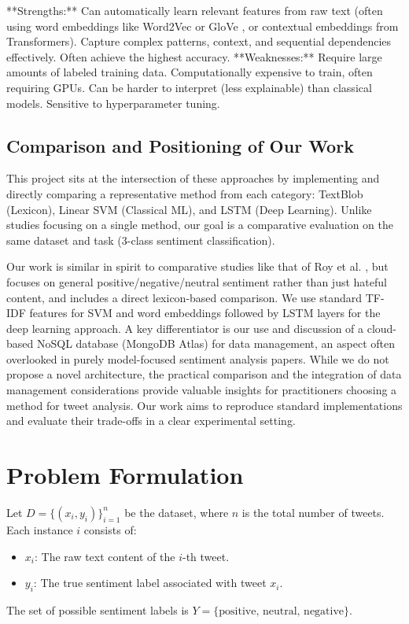 \documentclass[10pt,twocolumn]{article}
\begin{document}
**Strengths:** Can automatically learn relevant features from raw text (often using word embeddings like Word2Vec \cite{ref:word2vec} or GloVe \cite{ref:glove}, or contextual embeddings from Transformers). Capture complex patterns, context, and sequential dependencies effectively. Often achieve the highest accuracy.
**Weaknesses:** Require large amounts of labeled training data. Computationally expensive to train, often requiring GPUs. Can be harder to interpret (less explainable) than classical models. Sensitive to hyperparameter tuning.

\subsection{Comparison and Positioning of Our Work}
This project sits at the intersection of these approaches by implementing and directly comparing a representative method from each category: TextBlob (Lexicon), Linear SVM (Classical ML), and LSTM (Deep Learning). Unlike studies focusing on a single method, our goal is a comparative evaluation on the same dataset and task (3-class sentiment classification).

Our work is similar in spirit to comparative studies like that of Roy et al. \cite{ref:roy2024}, but focuses on general positive/negative/neutral sentiment rather than just hateful content, and includes a direct lexicon-based comparison. We use standard TF-IDF features for SVM and word embeddings followed by LSTM layers for the deep learning approach. A key differentiator is our use and discussion of a cloud-based NoSQL database (MongoDB Atlas) for data management, an aspect often overlooked in purely model-focused sentiment analysis papers. While we do not propose a novel architecture, the practical comparison and the integration of data management considerations provide valuable insights for practitioners choosing a method for tweet analysis. Our work aims to reproduce standard implementations and evaluate their trade-offs in a clear experimental setting.


\section{Problem Formulation}
\label{sec:problem_formulation}

Let $D = \{(x_i, y_i)\}_{i=1}^{n}$ be the dataset, where $n$ is the total number of tweets. Each instance $i$ consists of:
\begin{itemize}[itemsep=0pt, topsep=3pt]
    \item $x_i$: The raw text content of the $i$-th tweet.
    \item $y_i$: The true sentiment label associated with tweet $x_i$.
\end{itemize}
The set of possible sentiment labels is $Y = \{\text{positive, neutral, negative}\}$. %
\end{document}
